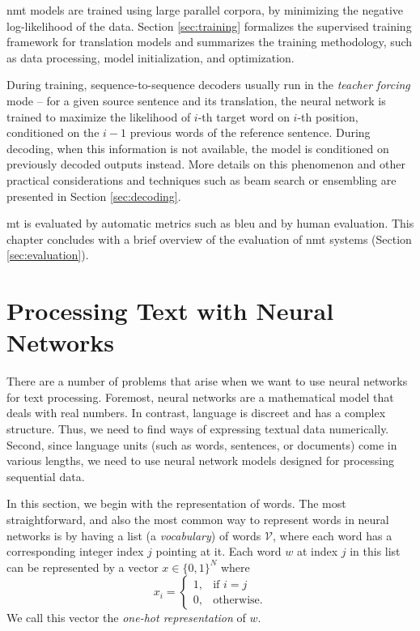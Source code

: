 \ac{nmt} models are trained using large parallel corpora, by minimizing the
negative log-likelihood of the data.  Section \ref{sec:training} formalizes the
supervised training framework for translation models and summarizes the
training methodology, such as data processing, model initialization, and
optimization.

During training, sequence-to-sequence decoders usually run in the \emph{teacher
  forcing} mode -- for a given source sentence and its translation, the neural
network is trained to maximize the likelihood of $i$-th target word on $i$-th
position, conditioned on the $i-1$ previous words of the reference
sentence. During decoding, when this information is not available, the model is
conditioned on previously decoded outputs instead. More details on this
phenomenon and other practical considerations and techniques such as beam
search or ensembling are presented in Section \ref{sec:decoding}.


\Ac{mt} is evaluated by automatic metrics such as \acs{bleu} and by human
evaluation. This chapter concludes with a brief overview of the evaluation of
\ac{nmt} systems (Section \ref{sec:evaluation}).

\section{Processing Text with Neural Networks}
\label{sec:text-processing}

There are a number of problems that arise when we want to use neural networks
for text processing. Foremost, neural networks are a mathematical model that
deals with real numbers. In contrast, language is discreet and has a complex
structure. Thus, we need to find ways of expressing textual data
numerically. Second, since language units (such as words, sentences, or
documents) come in various lengths, we need to use neural network models
designed for processing sequential data.

In this section, we begin with the representation of words. The most
straightforward, and also the most common way to represent words in neural
networks is by having a list (a \emph{vocabulary}) of words $\mathcal{V}$, where each
word has a corresponding integer index $j$ pointing at it. Each word $w$ at
index $j$ in this list can be represented by a vector
$x \in \{0,1\}^N$ where
%
\begin{equation} x_i =
\begin{cases} 1, & \text{if } i = j \\ 0, & \text{otherwise.}
\end{cases}
\end{equation}
%
We call this vector the \emph{one-hot representation} of $w$.

